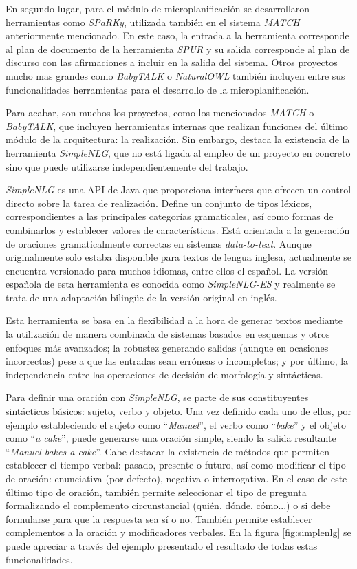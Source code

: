 En segundo lugar, para el módulo de microplanificación se desarrollaron herramientas como \textit{SPaRKy}, utilizada también en el sistema \textit{MATCH} anteriormente mencionado. En este caso, la entrada a la herramienta corresponde al plan de documento de la herramienta \textit{SPUR} y su salida corresponde al plan de discurso con las afirmaciones a incluir en la salida del sistema. Otros proyectos mucho mas grandes como \textit{BabyTALK} \citep{gatt_2009_babytalk} o \textit{NaturalOWL} también incluyen entre sus funcionalidades herramientas para el desarrollo de la microplanificación.

Para acabar, son muchos los proyectos, como los mencionados \textit{MATCH} o \textit{BabyTALK}, que incluyen herramientas internas que realizan funciones del último módulo de la arquitectura: la realización. Sin embargo, destaca la existencia de la herramienta \textit{SimpleNLG}, que no está ligada al empleo de un proyecto en concreto sino que puede utilizarse independientemente del trabajo.

\textit{SimpleNLG} \citep{simplenlg_gatt} es una API de Java que proporciona interfaces que ofrecen un control directo sobre la tarea de realización. Define un conjunto de tipos léxicos, correspondientes a las principales categorías gramaticales, así como formas de combinarlos y establecer valores de características. Está orientada a la generación de oraciones gramaticalmente correctas en sistemas \textit{data-to-text}. Aunque originalmente solo estaba disponible para textos de lengua inglesa, actualmente se encuentra versionado para muchos idiomas, entre ellos el español. La versión española de esta herramienta es conocida como \textit{SimpleNLG-ES} \citep{aramossoto2017adapting} y realmente se trata de una adaptación bilingüe de la versión original en inglés.

Esta herramienta se basa en la flexibilidad a la hora de generar textos mediante la utilización de manera combinada de sistemas basados en esquemas y otros enfoques más avanzados; la robustez generando salidas (aunque en ocasiones incorrectas) pese a que las entradas sean erróneas o incompletas; y por último, la independencia entre las operaciones de decisión de morfología y sintácticas.

Para definir una oración con \textit{SimpleNLG}, se parte de sus constituyentes sintácticos básicos: sujeto, verbo y objeto. Una vez definido cada uno de ellos, por ejemplo estableciendo el sujeto como ``\textit{Manuel}'', el verbo como ``\textit{bake}'' y el objeto como ``\textit{a cake}'', puede generarse una oración simple, siendo la salida resultante ``\textit{Manuel bakes a cake}''. Cabe destacar la existencia de métodos que permiten establecer el tiempo verbal: pasado, presente o futuro, así como modificar el tipo de oración: enunciativa (por defecto), negativa o interrogativa. En el caso de este último tipo de oración, también permite seleccionar el tipo de pregunta formalizando el complemento circunstancial (quién, dónde, cómo...) o si debe formularse para que la respuesta sea sí o no. También permite establecer complementos a la oración y modificadores verbales. En la figura \ref{fig:simplenlg} se puede apreciar a través del ejemplo presentado el resultado de todas estas funcionalidades.

